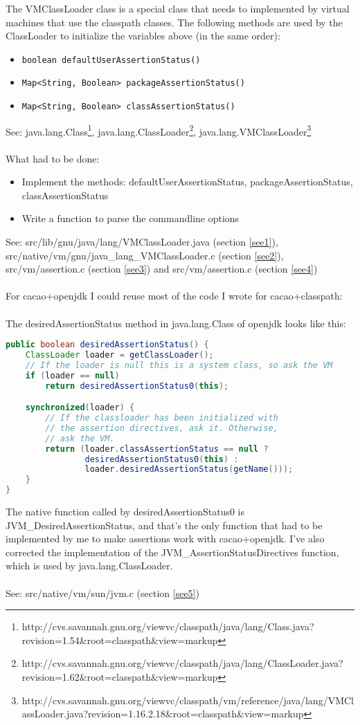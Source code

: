 \documentclass{article}%
\begin{document}
\noindent The VMClassLoader class is a special class that needs to implemented by virtual machines that use the classpath classes.
The following methods are used by the ClassLoader to initialize the variables above (in the same order):
\begin{itemize}
\item{\verb'boolean defaultUserAssertionStatus()'}
\item{\verb'Map<String, Boolean> packageAssertionStatus()'}
\item{\verb'Map<String, Boolean> classAssertionStatus()'}
\end{itemize}
See: java.lang.Class\footnote{http://cvs.savannah.gnu.org/viewvc/classpath/java/lang/Class.java?revision=1.54\&root=classpath\&view=markup}, java.lang.ClassLoader\footnote{http://cvs.savannah.gnu.org/viewvc/classpath/java/lang/ClassLoader.java?revision=1.62\&root=classpath\&view=markup}, java.lang.VMClassLoader\footnote{http://cvs.savannah.gnu.org/viewvc/classpath/vm/reference/java/lang/VMClassLoader.java?revision=1.16.2.18\&root=classpath\&view=markup}
\\
\\
What had to be done:
\begin{itemize}
\item{Implement the methods: defaultUserAssertionStatus, packageAssertionStatus, classAssertionStatus}
\item{Write a function to parse the commandline options}
\end{itemize}
See: src/lib/gnu/java/lang/VMClassLoader.java (section \ref{see1}), src/native/vm/gnu/java\_lang\_VMClassLoader.c (section \ref{see2}), src/vm/assertion.c (section \ref{see3}) and src/vm/assertion.c (section \ref{see4})
\\\\
For cacao+openjdk I could reuse most of the code I wrote for cacao+classpath:
\\\\
The desiredAssertionStatus method in java.lang.Class of openjdk looks like this:
\begin{lstlisting}[language=Java, firstnumber=2849]
public boolean desiredAssertionStatus() {
    ClassLoader loader = getClassLoader();
    // If the loader is null this is a system class, so ask the VM
    if (loader == null)
        return desiredAssertionStatus0(this);

    synchronized(loader) {
        // If the classloader has been initialized with
        // the assertion directives, ask it. Otherwise,
        // ask the VM.
        return (loader.classAssertionStatus == null ?
                desiredAssertionStatus0(this) :
                loader.desiredAssertionStatus(getName()));
    }
}

\end{lstlisting}
The native function called by desiredAssertionStatus0 is JVM\_DesiredAssertionStatus, and that's the only function that had to be implemented by me to make assertions work with cacao+openjdk. I've also corrected the implementation of the JVM\_AssertionStatusDirectives function, which is used by java.lang.ClassLoader.
\\
\\
See: src/native/vm/sun/jvm.c (section \ref{see5})
\end{document}
